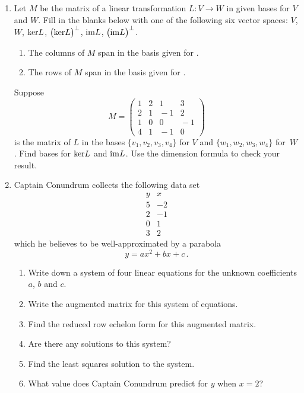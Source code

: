 \begin{enumerate}
\item Let $M$ be the matrix of a linear transformation $L:V\to W$ in given bases for $V$ and $W$.
Fill in the blanks below with one of the following six vector spaces: $V$, $W$, ${\rm ker} L$, 
$\big({\rm ker} L\big)^\perp$, ${\rm im} L$, $\big({\rm im} L\big)^\perp$.
\begin{enumerate}
\item The columns of $M$ span \underline{\phantom{answer}} in the basis given for \underline{\phantom{answer}}.
\item The rows of $M$ span \underline{\phantom{answer}} in the basis given for \underline{\phantom{answer}}.
\end{enumerate} 
Suppose \[M=\begin{pmatrix}1&2&1&3\\2&1&\!-1&2\\1&0&0&\!-1\\4&1&\!-1&0\end{pmatrix}\]
is the matrix of $L$ in the bases $\{v_1,v_2,v_3,v_4\}$ for $V$ and $\{w_1,w_2,w_3,w_4\}$ for~$W$.
Find bases for ${\rm ker} L$ and ${\rm im} L$. Use the dimension formula to check your result.

\item
Captain Conundrum collects the following data set
\[
\begin{array}{c|c}
y&x\\
\hline
5&-2\\
2&-1\\
0&1\\
3&2
\end{array}
\]
which he believes to be well-approximated by a parabola
\[
y=ax^2+bx+c\, .
\]

\begin{enumerate}
\item Write down a system of four linear equations for the unknown coefficients $a$, $b$ and $c$.
\item Write the augmented matrix for this system of equations.
\item Find the reduced row echelon form for this augmented matrix.
\item Are there any solutions to this system?
\item Find the least squares solution to the system.
\item What value does Captain Conundrum predict for $y$ when $x=2$? 
\end{enumerate}



\end{enumerate}
